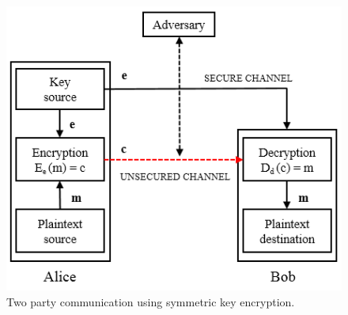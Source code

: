 	\begin{figure}[h!]
	 	\centering
	 	\includegraphics{images/symmetric-key.png}
	 	\caption{Two party communication using symmetric key encryption.}
	 	\label{fig:symmetric-key}
	 \end{figure} 

